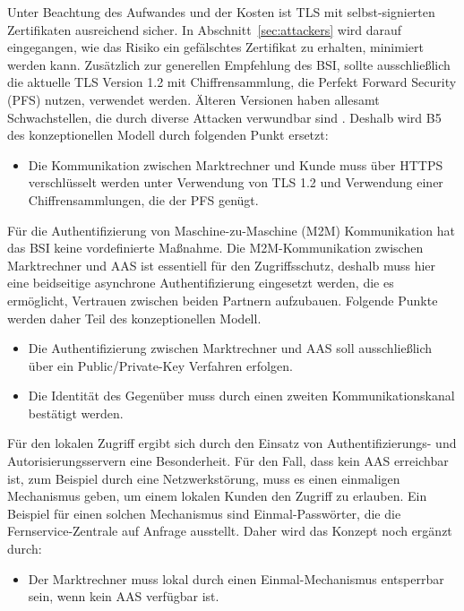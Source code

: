 \documentclass[11pt,a4paper]{report}
\begin{document}
Unter Beachtung des Aufwandes und der Kosten ist TLS mit selbst-signierten Zertifikaten ausreichend sicher. In Abschnitt~\ref{sec:attackers} wird darauf eingegangen, wie das Risiko ein gefälschtes Zertifikat zu erhalten, minimiert werden kann. Zusätzlich zur generellen Empfehlung des BSI, sollte ausschließlich die aktuelle TLS Version 1.2 mit Chiffrensammlung, die Perfekt Forward Security (PFS) nutzen, verwendet werden. Älteren Versionen haben allesamt Schwachstellen, die durch diverse Attacken verwundbar sind \cite{ssl_lighttpd}. Deshalb wird B5 des konzeptionellen Modell durch folgenden Punkt ersetzt:

\begin{itemize}[leftmargin=*]
\item Die Kommunikation zwischen Marktrechner und Kunde muss über HTTPS verschlüsselt werden unter Verwendung von TLS 1.2 und Verwendung einer Chiffrensammlungen, die der PFS genügt.
\end{itemize}

Für die Authentifizierung von Maschine-zu-Maschine (M2M) Kommunikation hat das BSI keine vordefinierte Maßnahme. Die M2M-Kommunikation zwischen Marktrechner und AAS ist essentiell für den Zugriffsschutz, deshalb muss hier eine beidseitige asynchrone Authentifizierung eingesetzt werden, die es ermöglicht, Vertrauen zwischen beiden Partnern aufzubauen. Folgende Punkte werden daher Teil des konzeptionellen Modell.

\begin{itemize}[leftmargin=*]
\item Die Authentifizierung zwischen Marktrechner und AAS soll ausschließlich über ein Public/Private-Key Verfahren erfolgen.
\item Die Identität des Gegenüber muss durch einen zweiten Kommunikationskanal bestätigt werden.
\end{itemize}

Für den lokalen Zugriff ergibt sich durch den Einsatz von Authentifizierungs- und Autorisierungsservern eine Besonderheit. Für den Fall, dass kein AAS erreichbar ist, zum Beispiel durch eine Netzwerkstörung, muss es einen einmaligen Mechanismus geben, um einem lokalen Kunden den Zugriff zu erlauben. Ein Beispiel für einen solchen Mechanismus sind Einmal-Passwörter, die die Fernservice-Zentrale auf Anfrage ausstellt. Daher wird das Konzept noch ergänzt durch:

\begin{itemize}[leftmargin=*]
\item Der Marktrechner muss lokal durch einen Einmal-Mechanismus entsperrbar sein, wenn kein AAS verfügbar ist.
\end{itemize}
\end{document}
